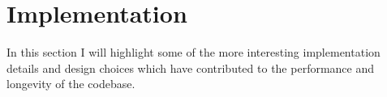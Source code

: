 \section{Implementation}

In this section I will highlight some of the more interesting implementation details and design choices which have contributed to the performance and longevity of the codebase.

